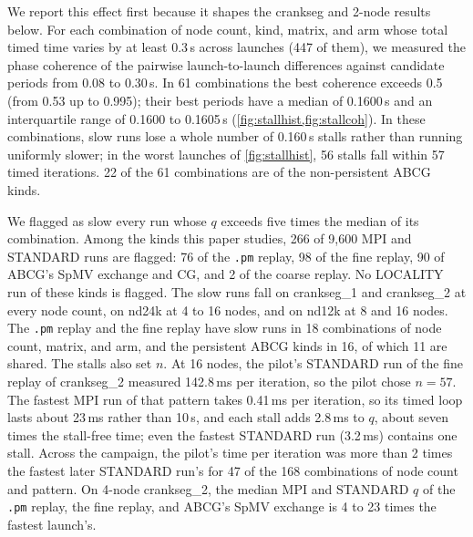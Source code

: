 \documentclass[11pt]{article}
\newcommand{\pmrep}{\texttt{.pm} replay}
\begin{document}
We report this effect first because it shapes the crankseg and 2-node results below.
For each combination of node count, kind, matrix, and arm whose total timed time varies
by at least 0.3\,s across launches (447 of them), we measured the phase coherence of
the pairwise launch-to-launch differences against candidate periods from 0.08 to
0.30\,s. In 61 combinations the best coherence exceeds 0.5 (from 0.53 up to 0.995);
their best periods have a median of 0.1600\,s and an interquartile range of 0.1600 to
0.1605\,s (\cref{fig:stallhist,fig:stallcoh}). In these combinations, slow runs lose a
whole number of 0.160\,s stalls rather than running uniformly slower; in the worst
launches of \cref{fig:stallhist}, 56 stalls fall within 57 timed iterations. 22 of the
61 combinations are of the non-persistent ABCG kinds.

We flagged as slow every run whose $q$ exceeds five times the median of its
combination. Among the kinds this paper studies, 266 of 9,600 MPI and STANDARD runs are
flagged: 76 of the \pmrep, 98 of the fine replay, 90 of ABCG's SpMV exchange and CG, and
2 of the coarse replay. No LOCALITY run of these kinds is flagged. The slow runs fall on
crankseg\_1 and crankseg\_2 at every node count, on nd24k at 4 to 16 nodes, and on nd12k
at 8 and 16 nodes. The \pmrep{} and the fine replay have slow runs in 18 combinations of
node count, matrix, and arm, and the persistent ABCG kinds in 16, of which 11 are
shared. The stalls also set $n$. At 16 nodes, the pilot's STANDARD run of the fine
replay of crankseg\_2 measured 142.8\,ms per iteration, so the pilot chose $n=57$. The
fastest MPI run of that pattern takes 0.41\,ms per iteration, so its timed loop lasts
about 23\,ms rather than 10\,s, and each stall adds 2.8\,ms to $q$, about seven times
the stall-free time; even the fastest STANDARD run (3.2\,ms) contains one stall. Across
the campaign, the pilot's time per iteration was more than 2 times the fastest later
STANDARD run's for 47 of the 168 combinations of node count and pattern. On 4-node crankseg\_2, the median MPI and STANDARD $q$ of the \pmrep,
the fine replay, and ABCG's SpMV exchange is 4 to 23 times the fastest launch's.
\end{document}
